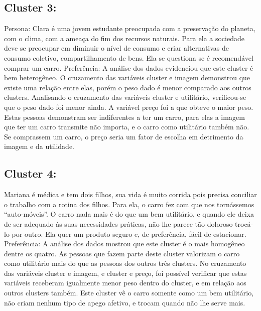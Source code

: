 \subsection{Cluster 3: \nomeCc{} }

Persona: Clara é uma jovem estudante preocupada com a preservação
do planeta, com o clima, com a ameaça do fim dos recursos naturais.
Para ela a sociedade deve se preocupar em diminuir o nível de consumo
e criar alternativas de consumo coletivo, compartilhamento de bens.
Ela se questiona se é recomendável comprar um carro. Preferência:
A análise dos dados evidenciou que este cluster é bem heterogêneo.
O cruzamento das variáveis cluster e imagem demonstrou que existe
uma relação entre elas, porém o peso dado é menor comparado aos outros
clusters. Analisando o cruzamento das variáveis cluster e utilitário,
verificou-se que o peso dado foi menor ainda. A variável preço foi
a que obteve o maior peso. Estas pessoas demonstram ser indiferentes
a ter um carro, para elas a imagem que ter um carro transmite não
importa, e o carro como utilitário também não. Se comprassem um carro,
o preço seria um fator de escolha em detrimento da imagem e da utilidade. 


\subsection{Cluster 4: \nomeCd{} }

Mariana é médica e tem dois filhos, sua vida é muito corrida pois
precisa conciliar o trabalho com a rotina dos filhos. Para ela, o
carro fez com que nos tornássemos \textquotedblleft auto-móveis\textquotedblright .
O carro nada mais é do que um bem utilitário, e quando ele deixa de
ser adequado às suas necessidades práticas, não lhe parece tão doloroso
trocá-lo por outro. Ela quer um produto seguro e, de preferência,
fácil de estacionar. Preferência: A análise dos dados mostrou que
este cluster é o mais homogêneo dentre os quatro. As pessoas que fazem
parte deste cluster valorizam o carro como utilitário mais do que
as pessoas dos outros três clusters. No cruzamento das variáveis cluster
e imagem, e cluster e preço, foi possível verificar que estas variáveis
receberam igualmente menor peso dentro do cluster, e em relação aos
outros clusters também. Este cluster vê o carro somente como um bem
utilitário, não criam nenhum tipo de apego afetivo, e trocam quando
não lhe serve mais. 
